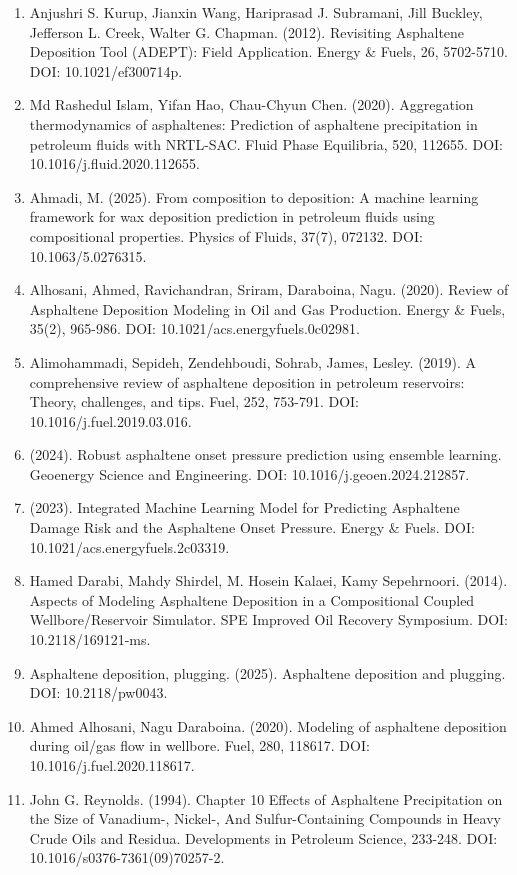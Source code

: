 \documentclass[11pt]{extarticle}
\providecommand{\tightlist}{\setlength{\itemsep}{0pt}\setlength{\parskip}{0pt}}
\begin{document}
\begin{enumerate}
\def\labelenumi{\arabic{enumi}.}
\tightlist
\item
  Anjushri S. Kurup, Jianxin Wang, Hariprasad J. Subramani, Jill Buckley, Jefferson L. Creek, Walter G. Chapman. (2012). Revisiting Asphaltene Deposition Tool (ADEPT): Field Application. Energy \& Fuels, 26, 5702-5710. DOI: 10.1021/ef300714p.
\item
  Md Rashedul Islam, Yifan Hao, Chau-Chyun Chen. (2020). Aggregation thermodynamics of asphaltenes: Prediction of asphaltene precipitation in petroleum fluids with NRTL-SAC. Fluid Phase Equilibria, 520, 112655. DOI: 10.1016/j.fluid.2020.112655.
\item
  Ahmadi, M. (2025). From composition to deposition: A machine learning framework for wax deposition prediction in petroleum fluids using compositional properties. Physics of Fluids, 37(7), 072132. DOI: 10.1063/5.0276315.
\item
  Alhosani, Ahmed, Ravichandran, Sriram, Daraboina, Nagu. (2020). Review of Asphaltene Deposition Modeling in Oil and Gas Production. Energy \& Fuels, 35(2), 965-986. DOI: 10.1021/acs.energyfuels.0c02981.
\item
  Alimohammadi, Sepideh, Zendehboudi, Sohrab, James, Lesley. (2019). A comprehensive review of asphaltene deposition in petroleum reservoirs: Theory, challenges, and tips. Fuel, 252, 753-791. DOI: 10.1016/j.fuel.2019.03.016.
\item
  (2024). Robust asphaltene onset pressure prediction using ensemble learning. Geoenergy Science and Engineering. DOI: 10.1016/j.geoen.2024.212857.
\item
  (2023). Integrated Machine Learning Model for Predicting Asphaltene Damage Risk and the Asphaltene Onset Pressure. Energy \& Fuels. DOI: 10.1021/acs.energyfuels.2c03319.
\item
  Hamed Darabi, Mahdy Shirdel, M. Hosein Kalaei, Kamy Sepehrnoori. (2014). Aspects of Modeling Asphaltene Deposition in a Compositional Coupled Wellbore/Reservoir Simulator. SPE Improved Oil Recovery Symposium. DOI: 10.2118/169121-ms.
\item
  Asphaltene deposition, plugging. (2025). Asphaltene deposition and plugging. DOI: 10.2118/pw0043.
\item
  Ahmed Alhosani, Nagu Daraboina. (2020). Modeling of asphaltene deposition during oil/gas flow in wellbore. Fuel, 280, 118617. DOI: 10.1016/j.fuel.2020.118617.
\item
  John G. Reynolds. (1994). Chapter 10 Effects of Asphaltene Precipitation on the Size of Vanadium-, Nickel-, And Sulfur-Containing Compounds in Heavy Crude Oils and Residua. Developments in Petroleum Science, 233-248. DOI: 10.1016/s0376-7361(09)70257-2.

\end{enumerate}
\end{document}
